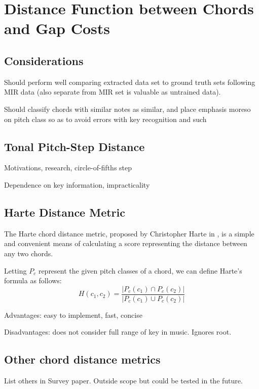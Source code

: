 \section{Distance Function between Chords and Gap Costs}

\subsection{Considerations}

\item Should perform well comparing extracted data set to ground truth sets following MIR data (also separate from MIR set is valuable as untrained data).

\item Should classify chords with similar notes as similar, and place emphasis moreso on pitch class so as to avoid errors with key recognition and such

\subsection{Tonal Pitch-Step Distance}

\item Motivations, research, circle-of-fifths step

\item Dependence on key information, impracticality

\subsection{Harte Distance Metric}

The Harte chord distance metric, proposed by Christopher Harte in \cite{harte2010towards}, is a simple and convenient means of calculating a score representing the distance between any two chords.

Letting $P_c$ represent the given pitch classes of a chord, we can define Harte's formula as follows:
\[ H(c_1,c_2) = \frac{\left| P_c(c_1) \cap P_c(c_2) \right|}{\left| P_c(c_1) \cup P_c(c_2) \right|} \]

\item Advantages: easy to implement, fast, concise

\item Disadvantages: does not consider full range of key in music. Ignores root.

\subsection{Other chord distance metrics}

\item List others in Survey paper. Outside scope but could be tested in the future.